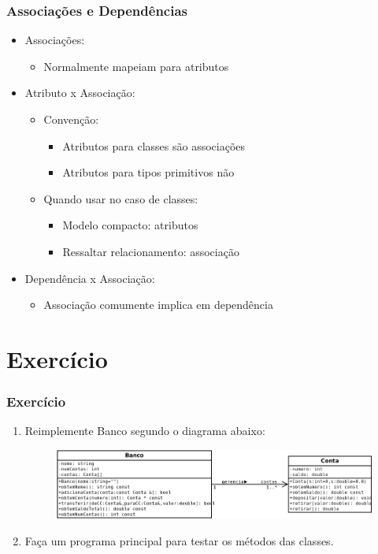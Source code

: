 \documentclass[aspectratio=169]{beamer}
\begin{document}
\begin{frame}\frametitle{Associações e Dependências}
\begin{itemize}
	\item Associações:
	\begin{itemize}
		\item Normalmente mapeiam para atributos
	\end{itemize}
	\item Atributo x Associação:
	\begin{itemize}
		\item Convenção:
		\begin{itemize}
			\item Atributos para classes são associações
			\item Atributos para tipos primitivos não
		\end{itemize}
		\item Quando usar no caso de classes:
		\begin{itemize}
			\item Modelo compacto: atributos
			\item Ressaltar relacionamento: associação
		\end{itemize}
	\end{itemize}
	\item Dependência x Associação:
	\begin{itemize}
		\item Associação comumente implica em dependência
	\end{itemize}
\end{itemize}
\end{frame}

\section{Exercício}

\begin{frame}\frametitle{Exercício}
\begin{enumerate}
	\item Reimplemente Banco segundo o diagrama abaixo:
\begin{figure}[h]
	\includegraphics[height=0.34\paperheight]{imagens/banco2.png}
\end{figure}
	\item Faça um programa principal para testar os métodos das classes.
\end{enumerate}
\end{frame}
\end{document}
